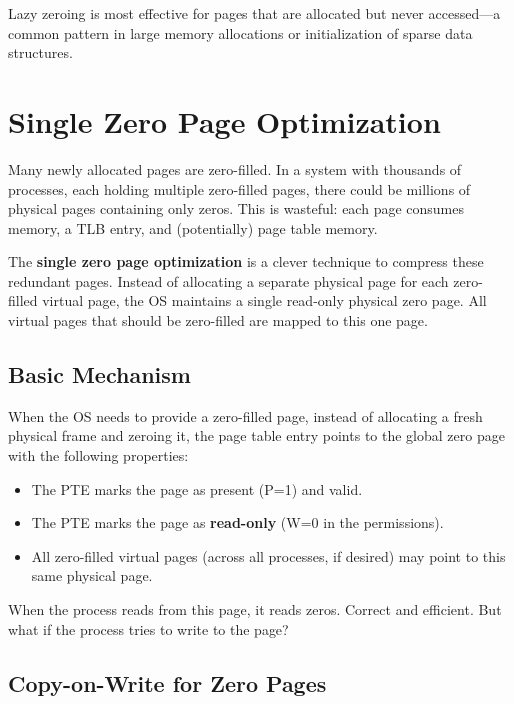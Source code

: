 \documentclass[11pt]{article}
\begin{document}
\begin{keytip}
Lazy zeroing is most effective for pages that are allocated but never accessed---a common pattern in large memory allocations or initialization of sparse data structures.
\end{keytip}

\section{Single Zero Page Optimization}

Many newly allocated pages are zero-filled. In a system with thousands of processes, each holding multiple zero-filled pages, there could be millions of physical pages containing only zeros. This is wasteful: each page consumes memory, a TLB entry, and (potentially) page table memory.

The \textbf{single zero page optimization} is a clever technique to compress these redundant pages. Instead of allocating a separate physical page for each zero-filled virtual page, the OS maintains a single read-only physical zero page. All virtual pages that should be zero-filled are mapped to this one page.

\subsection{Basic Mechanism}

When the OS needs to provide a zero-filled page, instead of allocating a fresh physical frame and zeroing it, the page table entry points to the global zero page with the following properties:

\begin{itemize}
    \item The PTE marks the page as present (P=1) and valid.
    \item The PTE marks the page as \textbf{read-only} (W=0 in the permissions).
    \item All zero-filled virtual pages (across all processes, if desired) may point to this same physical page.
\end{itemize}

When the process reads from this page, it reads zeros. Correct and efficient. But what if the process tries to write to the page?

\subsection{Copy-on-Write for Zero Pages}
\end{document}
